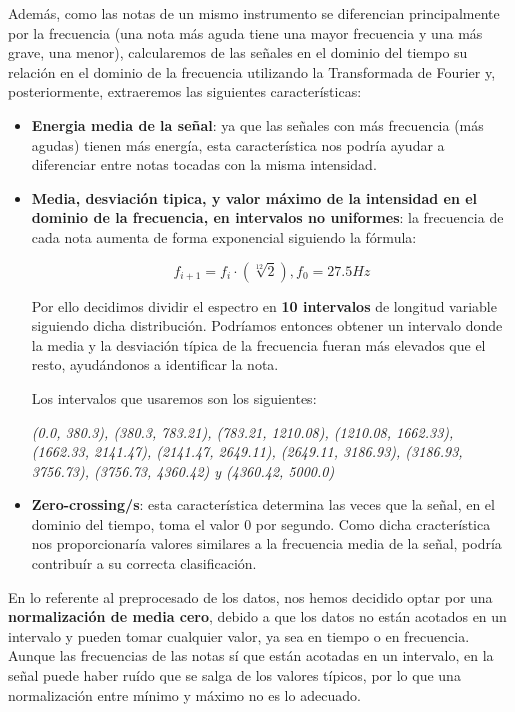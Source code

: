 \documentclass[12pt]{article}
\begin{document}
\bigskip
Además, como las notas de un mismo instrumento se diferencian principalmente por la frecuencia (una nota más aguda tiene una mayor frecuencia
y una más grave, una menor), calcularemos de las señales en el dominio del tiempo su relación en el dominio de la frecuencia utilizando la
Transformada de Fourier y, posteriormente, extraeremos las siguientes características:
\begin{itemize}
	\item \textbf{Energia media de la señal}: ya que las señales con más frecuencia (más agudas) tienen más energía, esta característica nos podría
		ayudar a diferenciar entre notas tocadas con la misma intensidad.
	\item \textbf{Media, desviación tipica, y valor máximo de la intensidad en el dominio de la frecuencia, en intervalos no uniformes}: la frecuencia de cada nota
		aumenta de forma exponencial siguiendo la fórmula:

		\begin{equation}
			f_{i+1} = f_{i}\cdot(\sqrt[12]{2}), f_0 = 27.5 Hz
		\end{equation}

		Por ello decidimos dividir el espectro en \textbf{10 intervalos} de longitud variable siguiendo dicha distribución. 
		Podríamos entonces obtener un intervalo donde la media y la desviación típica de la frecuencia fueran más elevados que el resto,
		ayudándonos a identificar la nota.
		
		Los intervalos que usaremos son los siguientes:
		
		\textit{(0.0, 380.3), (380.3, 783.21), (783.21, 1210.08), (1210.08, 1662.33),\newline
		(1662.33, 2141.47), (2141.47, 2649.11), (2649.11, 3186.93), (3186.93, 3756.73), 
		(3756.73, 4360.42) y (4360.42, 5000.0)}
	\item \textbf{Zero-crossing/s}: esta característica determina las veces que la señal, en el dominio del tiempo, toma el valor 0 por segundo.
		Como dicha cracterística nos proporcionaría valores similares a la frecuencia media de la señal, podría contribuír a su correcta clasificación.
\end{itemize}

En lo referente al preprocesado de los datos, nos hemos decidido optar por una \textbf{normalización de media cero},
debido a que los datos no están acotados en un intervalo y pueden tomar cualquier valor, ya sea
en tiempo o en frecuencia. Aunque las frecuencias de las notas sí que están acotadas en un intervalo, en la señal
puede haber ruído que se salga de los valores típicos, por lo que una normalización entre mínimo y máximo no es lo adecuado.
\end{document}
